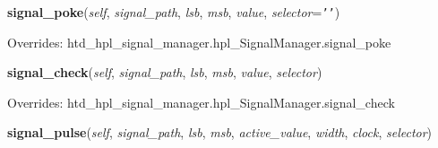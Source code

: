     \vspace{0.5ex}

\hspace{.8\funcindent}\begin{boxedminipage}{\funcwidth}

    \raggedright \textbf{signal\_poke}(\textit{self}, \textit{signal\_path}, \textit{lsb}, \textit{msb}, \textit{value}, \textit{selector}={\tt \texttt{'}\texttt{}\texttt{'}})

\setlength{\parskip}{2ex}
\setlength{\parskip}{1ex}
      Overrides: htd\_hpl\_signal\_manager.hpl\_SignalManager.signal\_poke

    \end{boxedminipage}

    \vspace{0.5ex}

\hspace{.8\funcindent}\begin{boxedminipage}{\funcwidth}

    \raggedright \textbf{signal\_check}(\textit{self}, \textit{signal\_path}, \textit{lsb}, \textit{msb}, \textit{value}, \textit{selector})

\setlength{\parskip}{2ex}
\setlength{\parskip}{1ex}
      Overrides: htd\_hpl\_signal\_manager.hpl\_SignalManager.signal\_check

    \end{boxedminipage}

    \label{htd_hpl_signal_manager:hpl_SignalManager_non_interactive:signal_pulse}

    \vspace{0.5ex}

\hspace{.8\funcindent}\begin{boxedminipage}{\funcwidth}

    \raggedright \textbf{signal\_pulse}(\textit{self}, \textit{signal\_path}, \textit{lsb}, \textit{msb}, \textit{active\_value}, \textit{width}, \textit{clock}, \textit{selector})

\setlength{\parskip}{2ex}
\setlength{\parskip}{1ex}
    \end{boxedminipage}

    \label{htd_hpl_signal_manager:hpl_SignalManager_non_interactive:signal_wait}

